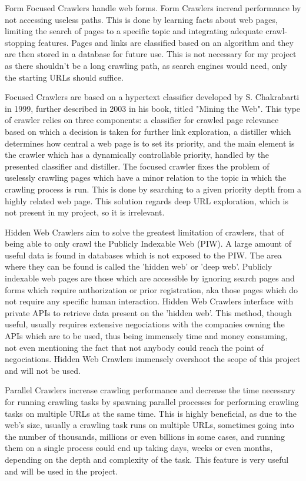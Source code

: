 \documentclass[12pt,a4paper,twoside]{report}
\begin{document}
Form Focused Crawlers handle web forms. Form Crawlers incread performance by not accessing useless paths. This is done by learning facts about web pages, limiting the search of pages to a specific topic and integrating adequate crawl-stopping features. Pages and links are classified based on an algorithm and they are then stored in a database for future use. This is not necessary for my project as there shouldn't be a long crawling path, as search engines would need, only the starting URLs should suffice.

Focused Crawlers are based on a hypertext classifier developed by S. Chakrabarti in 1999, further described in 2003 in his book, titled "Mining the Web". This type of crawler relies on three components: a classifier for crawled page relevance based on which a decision is taken for further link exploration, a distiller which determines how central a web page is to set its priority, and the main element is the crawler which has a dynamically controllable priority, handled by the presented classifier and distiller. The focused crawler fixes the problem of uselessly crawling pages which have a minor relation to the topic in which the crawling process is run. This is done by searching to a given priority depth from a highly related web page. This solution regards deep URL exploration, which is not present in my project, so it is irrelevant.

Hidden Web Crawlers aim to solve the greatest limitation of crawlers, that of being able to only crawl the Publicly Indexable Web (PIW). A large amount of useful data is found in databases which is not exposed to the PIW. The area where they can be found is called the 'hidden web' or 'deep web'. Publicly indexable web pages are those which are accessible by ignoring search pages and forms which require authorization or prior registration, aka those pages which do not require any specific human interaction. Hidden Web Crawlers interface with private APIs to retrieve data present on the 'hidden web'. This method, though useful, usually requires extensive negociations with the companies owning the APIs which are to be used, thus being immensely time and money consuming, not even mentioning the fact that not anybody could reach the point of negociations. Hidden Web Crawlers immensely overshoot the scope of this project and will not be used.

Parallel Crawlers increase crawling performance and decrease the time necessary for running crawling tasks by spawning parallel processes for performing crawling tasks on multiple URLs at the same time. This is highly beneficial, as due to the web's size, usually a crawling task runs on multiple URLs, sometimes going into the number of thousands, millions or even billions in some cases, and running them on a single process could end up taking days, weeks or even months, depending on the depth and complexity of the task. This feature is very useful and will be used in the project.
\end{document}
